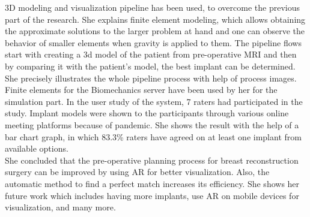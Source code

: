 \documentclass[12pt,letterpaper]{report}
\begin{document}
3D modeling and visualization pipeline has been used, to overcome the previous part of the research. She explains finite element modeling, which allows obtaining the approximate solutions to the larger problem at hand and one can observe the behavior of smaller elements when gravity is applied to them.  The pipeline flows start with creating a 3d model of the patient from pre-operative MRI and then by comparing it with the patient’s model, the best implant can be determined. She precisely illustrates the whole pipeline process with help of process images. Finite elements for the Biomechanics server have been used by her for the simulation part. In the user study of the system, 7 raters had participated in the study. Implant models were shown to the participants through various online meeting platforms because of pandemic. She shows the result with the help of a bar chart graph, in which 83.3\% raters have agreed on at least one implant from available options.\\

She concluded that the pre-operative planning process for breast reconstruction surgery can be improved by using AR for better visualization. Also, the automatic method to find a perfect match increases its efficiency. She shows her future work which includes having more implants, use AR on mobile devices for visualization, and many more.  
\end{document}
